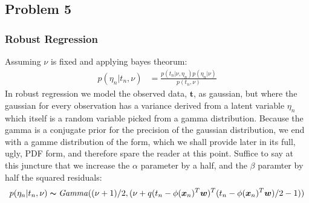 \documentclass[a4paper,12pt]{article}\usepackage[]{graphicx}\usepackage[]{color}
\begin{document}
\subsection*{Problem 5}

\subsubsection*{Robust Regression}

Assuming $\nu$ is fixed and applying bayes theorum:
%
\begin{align*}
p( \eta_n | t_n, \nu ) &= \frac{p(t_n | \nu, \eta_n) p(\eta_n | \nu)}{p(t_n, \nu)}
\end{align*}
%
In robust regression we model the observed data, $\bm{t}$, as gaussian, but where the gaussian for every observation has a variance derived from a latent variable $\eta_n$ which itself is a random variable picked from a gamma distribution. Because the gamma is a conjugate prior for the precision of the gaussian distribution, we end with a gamme distribution of the form, which we shall provide later in its full, ugly, PDF form, and therefore spare the reader at this point. Suffice to say at this juncture that we increase the $\alpha$ parameter by a half, and the $\beta$ paramter by half the squared residuals:
\begin{align*}
p( \eta_n | t_n, \nu ) \thicksim \mathit{Gamma}((\nu + 1)/2, (\nu + q(t_n - \phi(\bm{x}_n)^T\bm{w})^T(t_n - \phi(\bm{x}_n)^T\bm{w})/2 - 1))
\end{align*}
\end{document}
